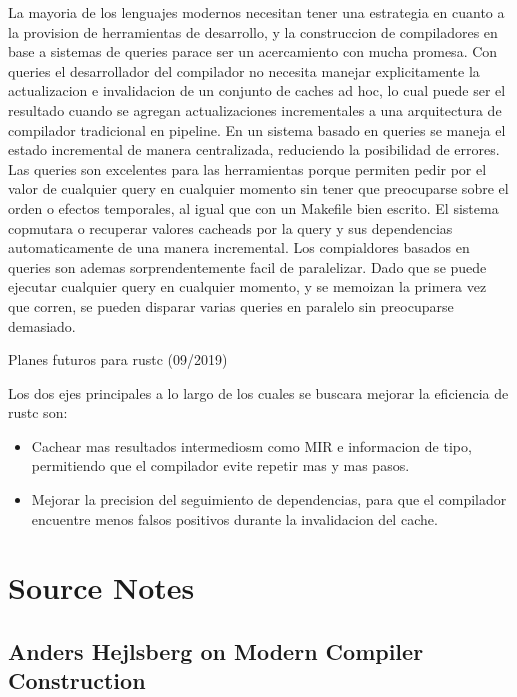 \documentclass[12pt, a4paper]{report}
\begin{document}
La mayoria de los lenguajes modernos necesitan tener una estrategia en cuanto a la provision de herramientas de desarrollo, y la construccion de compiladores en base a sistemas de queries parace ser un acercamiento con mucha promesa.
Con queries el desarrollador del compilador no necesita manejar explicitamente la actualizacion e invalidacion de un conjunto de caches ad hoc, lo cual puede ser el resultado cuando se agregan actualizaciones incrementales a una arquitectura de compilador tradicional en pipeline.
En un sistema basado en queries se maneja el estado incremental de manera centralizada, reduciendo la posibilidad de errores.
Las queries son excelentes para las herramientas porque permiten pedir por el valor de cualquier query en cualquier momento sin tener que preocuparse sobre el orden o efectos temporales, al igual que con un Makefile bien escrito.
El sistema copmutara o recuperar valores cacheads por la query y sus dependencias automaticamente de una manera incremental.
Los compialdores basados en queries son ademas sorprendentemente facil de paralelizar.
Dado que se puede ejecutar cualquier query en cualquier momento, y se memoizan la primera vez que corren, se pueden disparar varias queries en paralelo sin preocuparse demasiado.
\cite{olle_query_based}

Planes futuros para rustc (09/2019)

Los dos ejes principales a lo largo de los cuales se buscara mejorar la eficiencia de rustc son:
\begin{itemize}[noitemsep]
\item Cachear mas resultados intermediosm como MIR e informacion de tipo, permitiendo que el compilador evite repetir mas y mas pasos.
\item Mejorar la precision del seguimiento de dependencias, para que el compilador encuentre menos falsos positivos durante la invalidacion del cache.
\end{itemize}
\cite{rust_blog_incremental_compilation}

\chapter*{Source Notes}

\section*{Anders Hejlsberg on Modern Compiler Construction}
\end{document}
